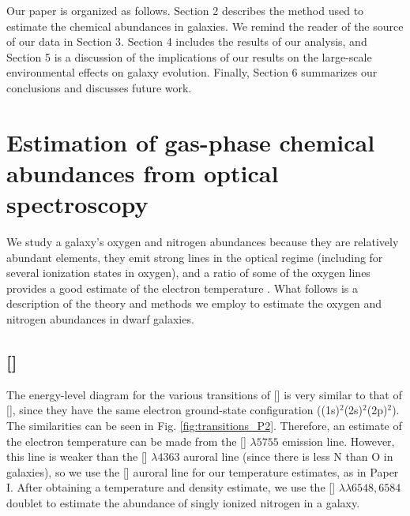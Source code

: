 Our paper is organized as follows.  Section 2 describes the method used to 
estimate the chemical abundances in galaxies.  We remind the reader of the 
source of our data in Section 3.  Section 4 includes the results of our analysis, 
and Section 5 is a discussion of the implications of our results on the 
large-scale environmental effects on galaxy evolution.  Finally, Section 6 
summarizes our conclusions and discusses future work.


%
%
\section[Theory]{Estimation of gas-phase chemical abundances from optical spectroscopy}
\label{sec:Theory}

We study a galaxy's oxygen and nitrogen abundances because they are relatively 
abundant elements, they emit strong lines in the optical regime (including for 
several ionization states in oxygen), and a ratio of some of the oxygen lines 
provides a good estimate of the electron temperature \citep{Kewley02}.  What 
follows is a description of the theory and methods we employ to estimate the 
oxygen and nitrogen abundances in dwarf galaxies.


\subsection{[]}

The energy-level diagram for the various transitions of [] is very 
similar to that of [], since they have the same electron ground-state 
configuration ((1s)$^2$(2s)$^2$(2p)$^2$).  The similarities can be seen in Fig. 
\ref{fig:transitions_P2}.  Therefore, an estimate of the electron temperature can 
be made from the [] $\lambda 5755$ emission line.  However, this line 
is weaker than the [] $\lambda 4363$ auroral line (since there is less 
N than O in galaxies), so we use the [] auroral line for our 
temperature estimates, as in Paper I.  After obtaining a temperature and density 
estimate, we use the [] $\lambda \lambda 6548, 6584$ doublet to 
estimate the abundance of singly ionized nitrogen in a galaxy.

